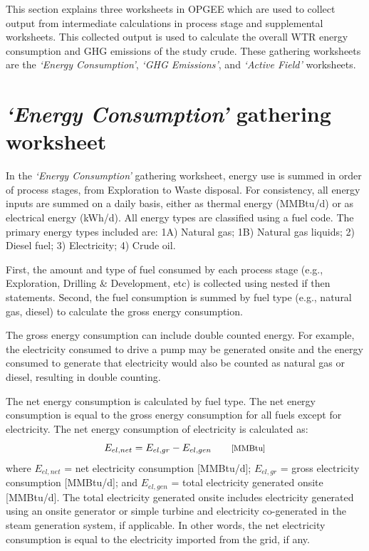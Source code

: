 \documentclass[11pt]{report}
\newcommand{\marg}[1]{{\footnotesize\textit{\textcolor{stanford}{'#1'}}}}
\newcommand{\marginnote}[1]{\marginpar{\marg{#1}}}
\newcommand{\sheet}[1]{\textit{`{#1}'}}
\begin{document}
This section explains three worksheets in OPGEE which are used to collect output from intermediate calculations in process stage and supplemental worksheets. This collected output is used to calculate the overall WTR energy consumption and GHG emissions of the study crude. These gathering worksheets are the \sheet{Energy Consumption}, \sheet{GHG Emissions}, and \sheet{Active Field} worksheets. 


\clearpage

\section{\sheet{Energy Consumption} gathering worksheet}\label{sec:energy_consumption}

In the \sheet{Energy Consumption} gathering worksheet, energy use is summed in order of process stages, from Exploration to Waste disposal. For consistency, all energy inputs are summed on a daily basis, either as thermal energy (MMBtu/d) or as electrical energy (kWh/d). All energy types are classified using a fuel code. The primary energy types included are: 1A) Natural gas; 1B) Natural gas liquids; 2) Diesel fuel; 3) Electricity; 4) Crude oil.

First, \marginnote{Energy \\ Consumption \\ Table 1} the amount and type of fuel consumed by each process stage (e.g., Exploration, Drilling \& Development, etc) is collected using nested if then statements. Second, \marginnote{Energy \\ Consumption \\ Table 2} the fuel consumption is summed by fuel type (e.g., natural gas, diesel) to calculate the gross energy consumption. 

The gross energy consumption can include double counted energy. For example, the electricity consumed to drive a pump may be generated onsite and the energy consumed to generate that electricity would also be counted as natural gas or diesel, resulting in double counting. 

The net energy consumption is calculated by \marginnote{Energy \\ Consumption \\ Table 1} fuel type. The net energy consumption is equal to the gross energy consumption for all fuels except for electricity. The net energy consumption of electricity is calculated as:
\begin{equation}\label{net_elec}
E_{el,net}= E_{el,gr} - E_{el,gen} \quad\quad \footnotesize{\text{[MMBtu]}}
\end{equation}
where $ E_{el,net}$ = net electricity consumption [MMBtu/d]; $E_{el,gr}$ = gross electricity consumption [MMBtu/d]; and $E_{el,gen}$ = total electricity generated onsite [MMBtu/d]. The total electricity generated onsite includes electricity generated using an onsite generator or simple turbine and electricity co-generated in the steam generation system, if applicable. In other words, the net electricity consumption is equal to the electricity imported from the grid, if any.
\end{document}
